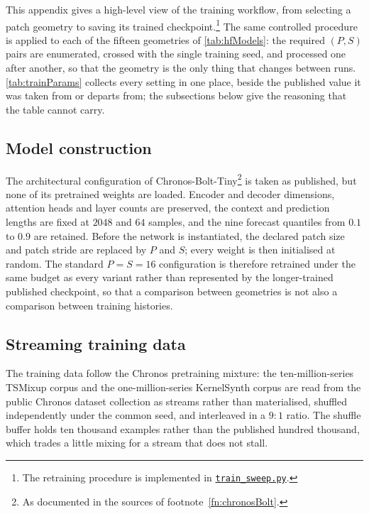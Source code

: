 This appendix gives a high-level view of the training workflow, from selecting a patch geometry to saving its trained checkpoint.\footnote{The retraining procedure is implemented in \href{https://github.com/FedericoSabbadini/patchAliasing/blob/main/notebooks/chronos_architecture/train_sweep.py}{\texttt{train\_sweep.py}}.} The same controlled procedure is applied to each of the fifteen geometries of \autoref{tab:hfModels}: the required $(P,S)$ pairs are enumerated, crossed with the single training seed, and processed one after another, so that the geometry is the only thing that changes between runs\@. \autoref{tab:trainParams} collects every setting in one place, beside the published value it was taken from or departs from; the subsections below give the reasoning that the table cannot carry.



\subsection{Model construction}

The architectural configuration of Chronos-Bolt-Tiny\footnote{As documented in the sources of footnote~\ref{fn:chronosBolt}.} is taken as published, but none of its pretrained weights are loaded. Encoder and decoder dimensions, attention heads and layer counts are preserved, the context and prediction lengths are fixed at $2048$ and $64$ samples, and the nine forecast quantiles from $0.1$ to $0.9$ are retained. Before the network is instantiated, the declared patch size and patch stride are replaced by $P$ and $S$; every weight is then initialised at random. The standard $P=S=16$ configuration is therefore retrained under the same budget as every variant rather than represented by the longer-trained published checkpoint, so that a comparison between geometries is not also a comparison between training histories.

\subsection{Streaming training data}

The training data follow the Chronos pretraining mixture\autocite{ansariChronosLearningLanguage2024,autogluonChronosDatasets2024}: the ten-million-series TSMixup corpus and the one-million-series KernelSynth corpus are read from the public Chronos dataset collection as streams rather than materialised, shuffled independently under the common seed, and interleaved in a $9{:}1$ ratio. The shuffle buffer holds ten thousand examples rather than the published hundred thousand, which trades a little mixing for a stream that does not stall.

